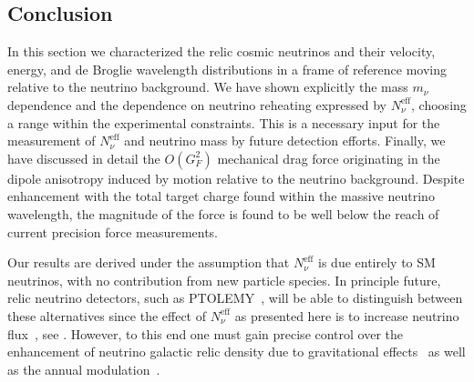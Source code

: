  
\subsection{Conclusion}
In this section we characterized the relic cosmic neutrinos and their velocity, energy, and de Broglie wavelength distributions in a frame of reference moving relative to the neutrino background. We have shown explicitly the mass $m_\nu$ dependence and the dependence on neutrino reheating expressed by $N_\nu^{\mathrm{eff}}$, choosing a range within the experimental constraints. This is a necessary input for the measurement of $N_\nu^{\mathrm{eff}}$ and neutrino mass by future detection efforts.  Finally, we have discussed in detail the $O(G_F^2)$ mechanical drag force  originating in the dipole anisotropy induced by motion relative to the neutrino background.  Despite enhancement with the total target charge found within the massive neutrino wavelength, the magnitude of the force is found to be well below the reach of current  precision force measurements.

Our results are derived under the assumption that $N_\nu^{\mathrm{eff}}$ is due entirely to SM neutrinos, with no contribution from new particle species. In principle future, relic neutrino detectors, such as PTOLEMY~\cite{PTOLEMY}, will be able to distinguish between these alternatives since the effect of $N_\nu^{\mathrm{eff}}$ as presented here is to increase neutrino flux~\cite{Birrell:2013_2}, see . However, to this end one must gain precise control over the enhancement of neutrino galactic relic density due to  gravitational effects~\cite{Ringwald:2004np} as well as the annual modulation~\cite{Safdi}. 